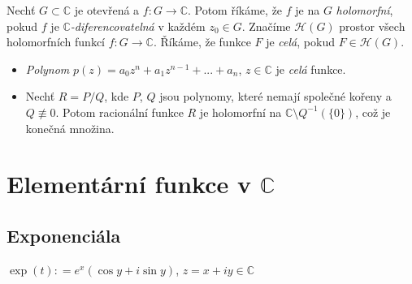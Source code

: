 
\begin{definition}
Nechť $G\subset \mathbb{C}$ je otevřená %
a $f \colon G \to \mathbb{C}$.
Potom říkáme, že $f$ je na $G$ \emph{holomorfní}, pokud $f$ je  $\mathbb{C}$\emph{-diferencovatelná} v každém $z_{0}\in {G}$. Značíme $\mathcal{H}(G)$ prostor všech holomorfních funkcí $f \colon G \to \mathbb{C}$. Říkáme, že funkce $F$ je \emph{celá}, pokud $F\in \mathcal{H}(G)$.
\end{definition}
\begin{example}\mbox{}
\begin{itemize}
    \item \emph{Polynom} $p(z) = a_0z^{n}+a_1z^{n-1}+...+a_n$, $z\in \mathbb{C}$ je \emph{celá} funkce.
    \item Nechť $R=P/Q$, kde $P$, $Q$ jsou polynomy, které nemají společné kořeny a $Q\not\equiv 0$. Potom racionální funkce $R$ je holomorfní na $\mathbb{C}\setminus Q^{-1}(\{0\})$, což je konečná množina.
\end{itemize}    
\end{example}


\section{Elementární funkce v \texorpdfstring{$\mathbb{C}$}{C}}
\subsection{Exponenciála}

\begin{definition}
$\exp(t)\colon=e^{x}(\cos y + i\sin y)$, $z=x+i y\in \mathbb{C}$
\end{definition}

